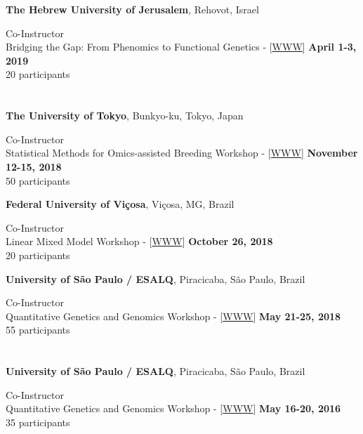 \documentclass[margin,line,10pt]{res}
\begin{document}
\begin{resume}
{\bf The Hebrew University of Jerusalem}, Rehovot, Israel
\vspace{.01pt}

Co-Instructor  \\
Bridging the Gap: From Phenomics to Functional Genetics - [\textcolor{blue}{\href{http://morotalab.org/HUJI2019/HUJI2019.html}{WWW}}]
\hfill {\bf April 1-3, 2019} \\
20 participants

\section{}

{\bf The University of Tokyo}, Bunkyo-ku, Tokyo, Japan
\vspace{.01pt}

Co-Instructor  \\
Statistical Methods for Omics-assisted Breeding Workshop - [\textcolor{blue}{\href{http://morotalab.org/UT2018/UT2018.html}{WWW}}]
\hfill {\bf November 12-15, 2018} \\
50 participants 



{\bf Federal University of Vi\c cosa}, Vi\c cosa, MG, Brazil
\vspace{.01pt}

Co-Instructor  \\
Linear Mixed Model Workshop - [\textcolor{blue}{\href{http://morotalab.org/UFV2018/UFV2018.html}{WWW}}]
\hfill {\bf October 26, 2018} \\
20 participants


{\bf University of S\~{a}o Paulo / ESALQ}, Piracicaba, S\~{a}o Paulo, Brazil
\vspace{.01pt}

Co-Instructor  \\
Quantitative Genetics and Genomics Workshop - [\textcolor{blue}{\href{http://morotalab.org/ESALQ2018/ESALQ2018.html}{WWW}}]
\hfill {\bf May 21-25, 2018} \\
55 participants


\section{}


{\bf University of S\~{a}o Paulo / ESALQ}, Piracicaba, S\~{a}o Paulo, Brazil
\vspace{.01pt}


Co-Instructor  \\
Quantitative Genetics and Genomics Workshop - [\textcolor{blue}{\href{http://morotalab.org/ESALQ2016/ESALQ2016.html}{WWW}}]
\hfill {\bf May 16-20, 2016} \\
35 participants  







\end{resume}
\end{document}
